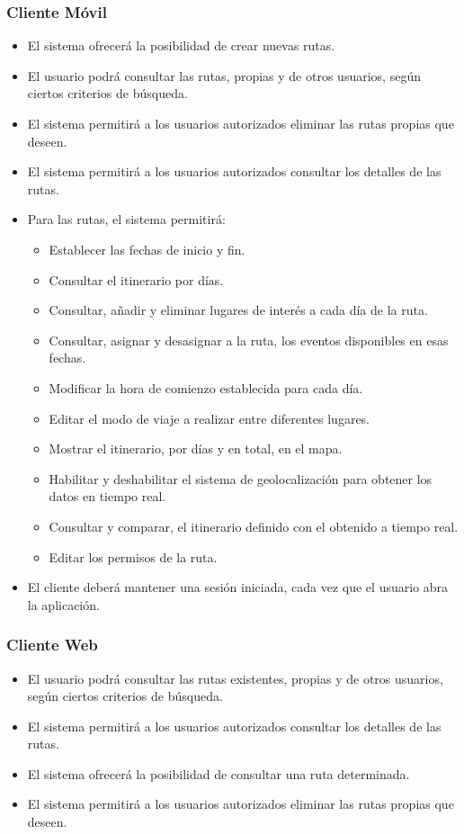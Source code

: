 \subsubsection*{Cliente Móvil}
\begin{itemize}
\setlength\itemsep{1pt}
\item El sistema ofrecerá la posibilidad de crear nuevas rutas.
\item El usuario podrá consultar las rutas, propias y de otros usuarios, según ciertos criterios de búsqueda.
\item El sistema permitirá a los usuarios autorizados eliminar las rutas propias que deseen.
\item El sistema permitirá a los usuarios autorizados consultar los detalles de las rutas.
\item Para las rutas, el sistema permitirá:
	\begin{itemize}
	\item Establecer las fechas de inicio y fin.
	\item Consultar el itinerario por días.
	\item Consultar, añadir y eliminar lugares de interés a cada día de la ruta.
	\item Consultar, asignar y desasignar a la ruta, los eventos disponibles en esas fechas.
	\item Modificar la hora de comienzo establecida para cada día.
	\item Editar el modo de viaje a realizar entre diferentes lugares.
	\item Mostrar el itinerario, por días y en total, en el mapa.
	\item Habilitar y deshabilitar el sistema de geolocalización para obtener los datos en tiempo real.
	\item Consultar y comparar, el itinerario definido con el obtenido a tiempo real.
	\item Editar los permisos de la ruta.
	\end{itemize}
\item El cliente deberá mantener una sesión iniciada, cada vez que el usuario abra la aplicación.
\end{itemize}

\subsubsection*{Cliente Web}
\begin{itemize}
\setlength\itemsep{1pt}
\item El usuario podrá consultar las rutas existentes, propias y de otros usuarios, según ciertos criterios de búsqueda.
\item El sistema permitirá a los usuarios autorizados consultar los detalles de las rutas.
\item El sistema ofrecerá la posibilidad de consultar una ruta determinada.
\item El sistema permitirá a los usuarios autorizados eliminar las rutas propias que deseen.
\end{itemize}


